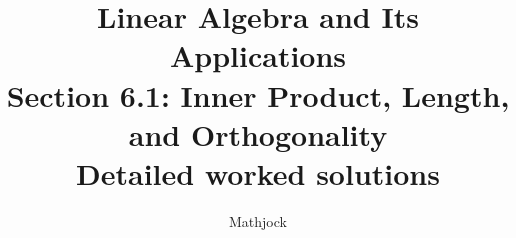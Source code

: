 
\title{\textbf{Linear Algebra and Its Applications}\\[0.3em]Section 6.1: Inner Product, Length, and Orthogonality\\[0.3em]\large Detailed worked solutions}
\author{Mathjock}
\date{}

\maketitle
\bookinfo
\tableofcontents
\clearpage
\renewcommand{\thesection}{6.\arabic{section}}
\renewcommand{\theHsection}{6.\arabic{section}}
\setcounter{section}{0}


